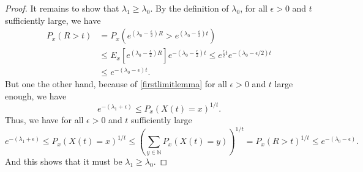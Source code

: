 \documentclass[12pt,a4paper]{scrartcl}
\numberwithin{equation}{section}
\newcommand{\N}{\mathbb{N}} %
\begin{document}
\begin{proof}
It remains to show that $\lambda_1 \geq \lambda_0.$
By the definition of $\lambda_0$, for all $\epsilon > 0$ and $t$ sufficiently large, we have
\begin{align*}
P_x\left(R > t\right) &= P_x\left(e^{\left(\lambda_0 - \frac{\epsilon}{2}\right)R } > e^{\left(\lambda_0 - \frac{\epsilon}{2}\right)t} \right) \\
&\leq E_x \left[ e^{\left(\lambda_0 - \frac{\epsilon}{2}\right)R } \right] e^{-\left(\lambda_0 - \frac{\epsilon}{2}\right)t} \leq e^{\frac{\epsilon}{2} t} e^{-\left(\lambda_0 - \epsilon/2\right)t} \\
&\leq e^{-\left(\lambda_0 - \epsilon\right)t}.
\end{align*}
But one the other hand, because of \eqref{firstlimitlemma} for all $\epsilon > 0$ and $t$ large enough, we have
$$e^{-\left(\lambda_1+\epsilon\right)} \leq P_x\left(X\left(t\right)=x\right)^{1/t}.$$ 
Thus, we have for all $\epsilon >0$ and $t$ sufficiently large
$$e^{-\left(\lambda_1+\epsilon\right)} \leq P_x\left(X\left(t\right)=x\right)^{1/t} \leq \left(\sum_{y \in \N}P_x\left(X\left(t\right)=y \right) \right)^{1/t} = P_x\left(R > t \right)^{1/t} \leq e^{-\left(\lambda_0 - \epsilon\right)}.$$
And this shows that it must be $\lambda_1 \geq \lambda_0.$

\end{proof}
\end{document}
